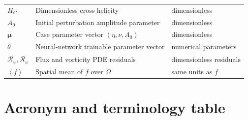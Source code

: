 \documentclass[11pt]{article}
\newcommand{\average}[1]{\left\langle #1\right\rangle}
\newcommand{\Rpsi}{\mathcal{R}_{\psi}}
\newcommand{\Romega}{\mathcal{R}_{\omega}}
\begin{document}
\begin{longtable}{p{}p{}p{}}
$H_C$ & Dimensionless cross helicity & dimensionless \\
$A_0$ & Initial perturbation amplitude parameter & dimensionless \\
$\boldsymbol{\mu}$ & Case parameter vector $(\eta,\nu,A_0)$ & dimensionless \\
$\theta$ & Neural-network trainable parameter vector & numerical parameters \\
$\Rpsi,\Romega$ & Flux and vorticity PDE residuals & dimensionless residuals \\
$\average{f}$ & Spatial mean of $f$ over $\Omega$ & same units as $f$ \\
\bottomrule
\end{longtable}
\normalsize

\section{Acronym and terminology table}
\label{app:acronyms}
\end{document}
